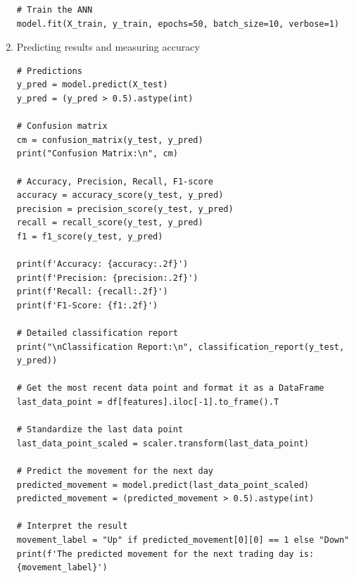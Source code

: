 \documentclass[12pt,a4paper]{report}
\begin{document}
\begin{enumerate}
\begin{verbatim}
# Train the ANN
model.fit(X_train, y_train, epochs=50, batch_size=10, verbose=1)
       \end{verbatim}
       \item Predicting results and measuring accuracy
       \begin{verbatim}
# Predictions
y_pred = model.predict(X_test)
y_pred = (y_pred > 0.5).astype(int)

# Confusion matrix
cm = confusion_matrix(y_test, y_pred)
print("Confusion Matrix:\n", cm)

# Accuracy, Precision, Recall, F1-score
accuracy = accuracy_score(y_test, y_pred)
precision = precision_score(y_test, y_pred)
recall = recall_score(y_test, y_pred)
f1 = f1_score(y_test, y_pred)

print(f'Accuracy: {accuracy:.2f}')
print(f'Precision: {precision:.2f}')
print(f'Recall: {recall:.2f}')
print(f'F1-Score: {f1:.2f}')

# Detailed classification report
print("\nClassification Report:\n", classification_report(y_test, y_pred))

# Get the most recent data point and format it as a DataFrame
last_data_point = df[features].iloc[-1].to_frame().T

# Standardize the last data point
last_data_point_scaled = scaler.transform(last_data_point)

# Predict the movement for the next day
predicted_movement = model.predict(last_data_point_scaled)
predicted_movement = (predicted_movement > 0.5).astype(int)

# Interpret the result
movement_label = "Up" if predicted_movement[0][0] == 1 else "Down"
print(f'The predicted movement for the next trading day is:
{movement_label}')
       \end{verbatim}
\end{enumerate}
\end{document}
